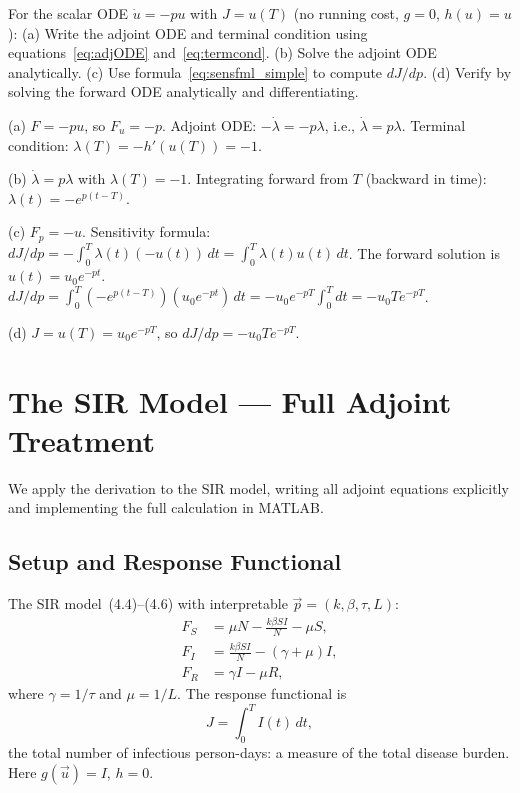 \begin{selfcheck}
For the scalar ODE $\dot{u} = -pu$ with $J = u(T)$
(no running cost, $g = 0$, $h(u) = u$):
(a) Write the adjoint ODE and terminal condition using
    equations~\eqref{eq:adjODE} and~\eqref{eq:termcond}.
(b) Solve the adjoint ODE analytically.
(c) Use formula~\eqref{eq:sensfml_simple} to compute $dJ/dp$.
(d) Verify by solving the forward ODE analytically and differentiating.
\end{selfcheck}
\begin{scAnswer}
(a) $F = -pu$, so $F_u = -p$.
Adjoint ODE: $-\dot{\lambda} = -p\lambda$, i.e., $\dot{\lambda} = p\lambda$.
Terminal condition: $\lambda(T) = -h'(u(T)) = -1$.

(b) $\dot{\lambda} = p\lambda$ with $\lambda(T) = -1$.
Integrating forward from $T$ (backward in time):
$\lambda(t) = -e^{p(t-T)}$.

(c) $F_p = -u$. Sensitivity formula:
$dJ/dp = -\int_0^T \lambda(t)(-u(t))\,dt = \int_0^T \lambda(t)u(t)\,dt$.
The forward solution is $u(t) = u_0 e^{-pt}$.
$dJ/dp = \int_0^T (-e^{p(t-T)})(u_0 e^{-pt})\,dt
= -u_0 e^{-pT}\int_0^T dt = -u_0 T e^{-pT}$.

(d) $J = u(T) = u_0 e^{-pT}$, so $dJ/dp = -u_0 T e^{-pT}$. \checkmark
\end{scAnswer}

\section{The SIR Model --- Full Adjoint Treatment}
\label{sec:sirAdjoint}

We apply the derivation to the SIR model, writing all adjoint equations
explicitly and implementing the full calculation in MATLAB.

\subsection{Setup and Response Functional}

The SIR model~(4.4)--(4.6) with interpretable \POIs
$\vec{p} = (k, \beta, \tau, L)$:
\begin{align*}
  F_S &= \mu N - \frac{k\beta SI}{N} - \mu S, \\
  F_I &= \frac{k\beta SI}{N} - (\gamma + \mu)I, \\
  F_R &= \gamma I - \mu R,
\end{align*}
where $\gamma = 1/\tau$ and $\mu = 1/L$.
The response functional is
\begin{equation}
  J = \int_0^T I(t)\,dt,
  \label{eq:sirJ}
\end{equation}
the total number of infectious person-days: a measure of
the total disease burden. Here $g(\vec{u}) = I$, $h = 0$.


